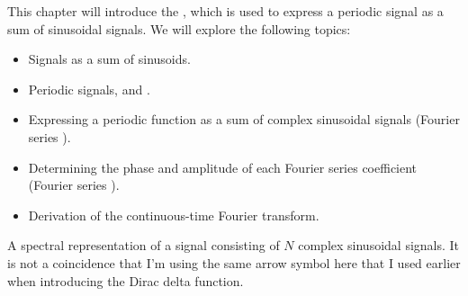 This chapter will introduce the \emph{}, which is used to express a
periodic signal as a sum of sinusoidal signals.
We will explore the following topics:
\begin{itemize}
  \item Signals as a sum of sinusoids.
  \item Periodic signals, \emph{} and \emph{}.
  \item Expressing a periodic function as a sum of complex sinusoidal signals (Fourier series ).
  \item Determining the phase and amplitude of each Fourier series coefficient (Fourier series ).
  \item Derivation of the continuous-time Fourier transform.
\end{itemize}

\begin{marginfigure}
  \begin{center}
  \end{center}
  \caption{A spectral representation of a signal consisting of $N$ complex sinusoidal signals.
    It is not a coincidence that I'm using the same arrow symbol here that I used earlier when introducing the Dirac delta function.}
  \label{fig:spec_rep}
\end{marginfigure}

